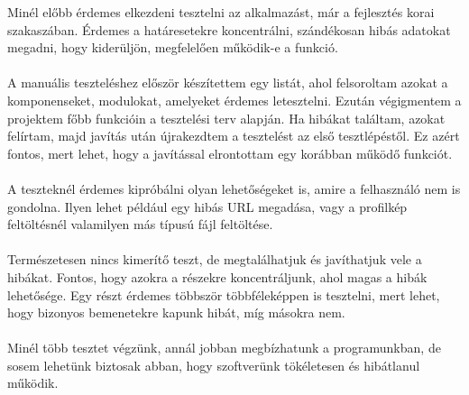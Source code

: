 \documentclass[
]{thesis-ekf}
\theoremstyle{definition}
\theoremstyle{remark}
\begin{document}
Minél előbb érdemes elkezdeni tesztelni az alkalmazást, már a fejlesztés korai szakaszában. Érdemes a határesetekre koncentrálni, szándékosan hibás adatokat megadni, hogy kiderüljön, megfelelően működik-e a funkció.
\\\\
A manuális teszteléshez először készítettem egy listát, ahol felsoroltam azokat a komponenseket, modulokat, amelyeket érdemes letesztelni. Ezután végigmentem a projektem főbb funkcióin a tesztelési terv alapján. Ha hibákat találtam, azokat felírtam, majd javítás után újrakezdtem a tesztelést az első tesztlépéstől. Ez azért fontos, mert lehet, hogy a javítással elrontottam egy korábban működő funkciót.
\\\\
A teszteknél érdemes kipróbálni olyan lehetőségeket is, amire a felhasználó nem is gondolna. Ilyen lehet például egy hibás URL megadása, vagy a profilkép feltöltésnél valamilyen más típusú fájl feltöltése.
\\\\
Természetesen nincs kimerítő teszt, de megtalálhatjuk és javíthatjuk vele a hibákat. Fontos, hogy azokra a részekre koncentráljunk, ahol magas a hibák lehetősége. Egy részt érdemes többször többféleképpen is tesztelni, mert lehet, hogy bizonyos bemenetekre kapunk hibát, míg másokra nem.
\\\\
Minél több tesztet végzünk, annál jobban megbízhatunk a programunkban, de sosem lehetünk biztosak abban, hogy szoftverünk tökéletesen és hibátlanul működik.
\end{document}
